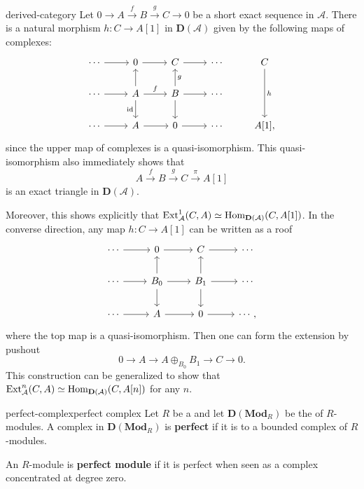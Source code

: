 \begin{example}{derived-category}
    Let $0 \to A \xrightarrow{f} B \xrightarrow{g} C \to 0$ be a short exact sequence in $\mathcal{A}$. There is a natural morphism $h : C \to A[1]$ in $\textbf{D}(\mathcal{A})$ given by the following maps of complexes:
    \[ \begin{tikzcd} \cdots \arrow{r} & 0 \arrow{r} & C \arrow{r} & \cdots & C \arrow{dd}{h} \\ \cdots \arrow{r} & A \arrow{u} \arrow[swap]{d}{\id} \arrow{r}{f} & B \arrow{d} \arrow[swap]{u}{g} \arrow{r} & \cdots & \\ \cdots \arrow{r} & A \arrow{r} & 0 \arrow{r} & \cdots & A[1] , \end{tikzcd} \]
    since the upper map of complexes is a quasi-isomorphism. This quasi-isomorphism also immediately shows that
    \[ A \xrightarrow{f} B \xrightarrow{g} C \xrightarrow{\pi} A[1] \]
    is an exact triangle in $\textbf{D}(\mathcal{A})$.
    
    Moreover, this shows explicitly that $\textup{Ext}_\mathcal{A}^1(C, A) \simeq \text{Hom}_{\textbf{D}(\mathcal{A})}(C, A[1])$. In the converse direction, any map $h : C \to A[1]$ can be written as a roof
    \[ \begin{tikzcd} \cdots \arrow{r} & 0 \arrow{r} & C \arrow{r} & \cdots \\ \cdots \arrow{r} & B_0 \arrow{u} \arrow{d} \arrow{r} & B_1 \arrow{d} \arrow{u} \arrow{r} & \cdots \\ \cdots \arrow{r} & A \arrow{r} & 0 \arrow{r} & \cdots , \end{tikzcd} \]
    where the top map is a quasi-isomorphism. Then one can form the extension by pushout 
    \[ 0 \to A \to A \oplus_{B_0} B_1 \to C \to 0 . \]
    This construction can be generalized to show that $\textup{Ext}_{\mathcal{A}}^n(C, A) \simeq \text{Hom}_{\textbf{D}(\mathcal{A})}(C, A[n])$ for any $n$.
\end{example}

    

\begin{topic}{perfect-complex}{perfect complex}
    Let $R$ be a  and let $\textbf{D}(\textbf{Mod}_R)$ be the  of $R$-modules. A complex in $\textbf{D}(\textbf{Mod}_R)$ is \textbf{perfect} if it is  to a bounded complex of   $R$-modules.
    
    An $R$-module is \textbf{perfect module} if it is perfect when seen as a complex concentrated at degree zero.
\end{topic}

